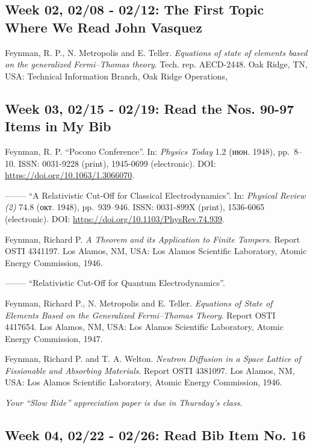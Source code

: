 \documentclass[]{article}
\begin{document}
\subsection{Week 02, 02/08 - 02/12: The First Topic Where We Read John
Vasquez}\label{week-02-0208---0212-the-first-topic-where-we-read-john-vasquez}

Feynman, R. P., N. Metropolis and E. Teller.
\emph{Equations of state of elements based on the
generalized Fermi--Thomas theory}. Tech. rep. AECD-2448. Oak Ridge, TN,
USA: Technical Information Branch, Oak Ridge Operations,

\subsection{Week 03, 02/15 - 02/19: Read the Nos. 90-97 Items in My
Bib}\label{week-03-0215---0219-read-the-nos.-90-97-items-in-my-bib}

Feynman, R. P. ``Pocono Conference''. In: \emph{Physics Today} 1.2 (июн.
1948), pp.~8--10. ISSN: 0031-9228 (print), 1945-0699 (electronic). DOI:
\url{https://doi.org/10.1063/1.3066070}.

-------- ``A Relativistic Cut-Off for Classical Electrodynamics''. In:
\emph{Physical Review (2)} 74.8 (окт. 1948), pp.~939--946. ISSN:
0031-899X (print), 1536-6065 (electronic). DOI:
\url{https://doi.org/10.1103/PhysRev.74.939}.

Feynman, Richard P.
\emph{A Theorem and its Application to Finite Tampers}. Report OSTI
4341197. Los Alamos, NM, USA: Los Alamos Scientific Laboratory, Atomic
Energy Commission, 1946.

-------- ``Relativistic Cut-Off for Quantum Electrodynamics''.

Feynman, Richard P., N. Metropolis and E. Teller.
\emph{Equations of State of Elements Based on the
Generalized Fermi--Thomas Theory}. Report OSTI 4417654. Los Alamos, NM,
USA: Los Alamos Scientific Laboratory, Atomic Energy Commission, 1947.

Feynman, Richard P. and T. A. Welton.
\emph{Neutron Diffusion in a Space Lattice of Fissionable
and Absorbing Materials}. Report OSTI 4381097. Los Alamos, NM, USA: Los
Alamos Scientific Laboratory, Atomic Energy Commission, 1946.

\emph{Your ``Slow Ride'' appreciation paper is due in Thursday's class}.

\subsection{Week 04, 02/22 - 02/26: Read Bib Item No.
16}\label{week-04-0222---0226-read-bib-item-no.-16}
\end{document}
